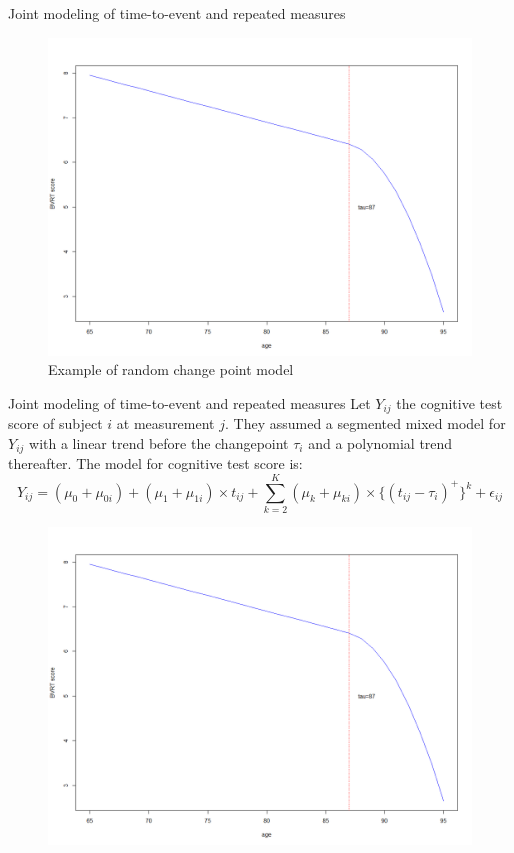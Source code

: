 \documentclass{beamer}
\begin{document}
\begin{frame}[t]{Joint modeling of time-to-event and repeated measures}\vspace{10pt}
\begin{figure}[h!]
	\includegraphics[scale=0.55]{rcp.png}
	\caption{Example of random change point model}
	\label{fig:fig2}
\end{figure}
\end{frame}

\begin{frame}[t]{Joint modeling of time-to-event and repeated measures}\vspace{10pt}
Let $Y_{ij}$ the cognitive test score of subject $i$ at measurement $j$. They assumed a segmented mixed model for $Y_{ij}$ with a linear trend before the changepoint $\tau_{i}$ and a polynomial trend thereafter. The model for cognitive test score is:
\begin{equation}
Y_{ij}=(\mu_0+\mu_{0i})+(\mu_1+\mu_{1i}) \times t_{ij}+\sum_{k=2}^{K}(\mu_k+\mu_{ki}) \times \{(t_{ij}-\tau_i)^{+}\}^k+\epsilon_{ij}
\end{equation}
\begin{figure}[h!]
	\includegraphics[scale=0.3]{rcp.png}

	\label{fig:fig2s}
\end{figure}
\end{frame}
\end{document}
